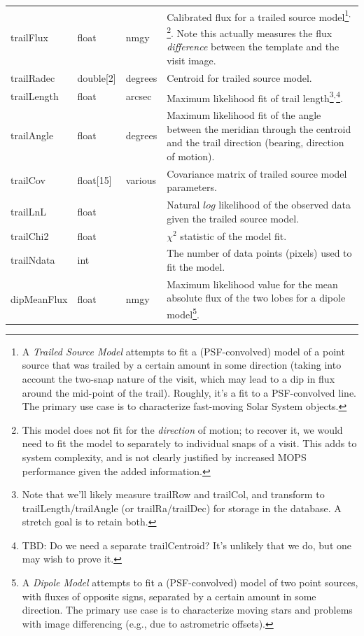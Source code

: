 \documentclass[12pt]{article}
\begin{document}
\begin{center}
\begin{longtable}{p{3cm}p{2cm}p{2cm}p{5cm}}
trailFlux & float & nmgy & Calibrated flux for a trailed source model\footnote{A {\em Trailed Source Model} attempts to fit a (PSF-convolved) model of a point source that was trailed by a certain amount in some direction (taking into account the two-snap nature of the visit, which may lead to a dip in flux around the mid-point of the trail). Roughly, it's a fit to a PSF-convolved line. The primary use case is to characterize fast-moving Solar System objects.}$^,$\footnote{This model does not fit for the {\em direction} of motion; to recover it, we would need to fit the model to separately to individual snaps of a visit. This adds to system complexity, and is not clearly justified by increased MOPS performance given the added information.}. Note this actually measures the flux {\em difference} between the template and the visit image. \\

trailRadec & double[2] & degrees & Centroid for trailed source model. \\

trailLength & float & arcsec & Maximum likelihood fit of trail length\footnote{Note that we'll likely measure trailRow and trailCol, and transform to trailLength/trailAngle (or trailRa/trailDec) for storage in the database. A stretch goal is to retain both.}$^,$\footnote{TBD: Do we need a separate trailCentroid? It's unlikely that we do, but one may wish to prove it.}. \\

trailAngle & float & degrees & Maximum likelihood fit of the angle between the meridian through the centroid and the trail direction (bearing, direction of motion). \\

trailCov & float[15] & various & Covariance matrix of trailed source model parameters. \\

trailLnL & float & ~ & Natural $log$ likelihood of the observed data given the trailed source model. \\

trailChi2 & float & ~ & $\chi^2$ statistic of the model fit. \\

trailNdata & int & ~ & The number of data points (pixels) used to fit the model. \\

dipMeanFlux & float & nmgy & Maximum likelihood value for the mean absolute flux of the two lobes for a dipole model\footnote{A {\em Dipole Model} attempts to fit a (PSF-convolved) model of two point sources, with fluxes
of opposite signs, separated by a certain amount in some direction. The primary use case is to characterize moving stars and problems with image differencing (e.g., due to astrometric offsets).}.
\\


\end{longtable}
\end{center}
\end{document}
